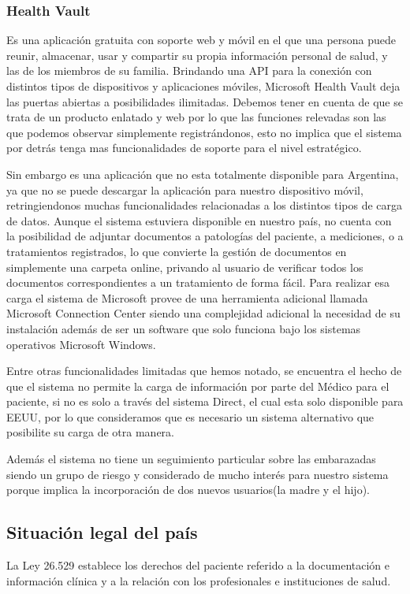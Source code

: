 \subsubsection{Health Vault}
	 Es una aplicación gratuita con soporte web y móvil en el que una persona puede reunir, almacenar, usar y compartir su propia información personal de salud, y las de los miembros de su familia. Brindando una API para la conexión con distintos tipos de dispositivos y aplicaciones móviles, Microsoft Health Vault deja las puertas abiertas a posibilidades ilimitadas. 
     Debemos tener en cuenta de que se trata de un producto enlatado y web por lo que las funciones relevadas son las que podemos observar simplemente registrándonos, esto no implica que el sistema por detrás tenga mas funcionalidades de soporte para el nivel estratégico.
     
     Sin embargo es una aplicación que no esta totalmente disponible para Argentina, ya que no se puede descargar la aplicación para nuestro dispositivo móvil, retringiendonos muchas funcionalidades relacionadas a los distintos tipos de carga de datos.
     Aunque el sistema estuviera disponible en nuestro país, no cuenta con la posibilidad de adjuntar documentos a patologías del paciente, a mediciones, o a tratamientos registrados, lo que convierte la gestión de documentos en simplemente una carpeta online, privando al usuario de verificar todos los documentos correspondientes a un tratamiento de forma fácil. Para realizar esa carga el sistema de Microsoft provee de una herramienta adicional llamada Microsoft Connection Center siendo una complejidad adicional la necesidad de su instalación además de ser un software que solo funciona bajo los sistemas operativos Microsoft Windows.
	
    Entre otras funcionalidades limitadas que hemos notado, se encuentra el hecho de que el sistema no permite la carga de información por parte del Médico para el paciente, si no es solo a través del sistema Direct, el cual esta solo disponible para EEUU, por lo que consideramos que es necesario un sistema alternativo que posibilite su carga de otra manera.
    
	Además el sistema no tiene un seguimiento particular sobre las embarazadas siendo un grupo de riesgo y considerado de mucho interés para nuestro sistema porque implica la incorporación de dos nuevos usuarios(la madre y el hijo).
     
\subsection{Situación legal del país}   
La Ley 26.529 establece los derechos del paciente referido a la documentación e información clínica y a la relación con los profesionales e instituciones de salud. 

